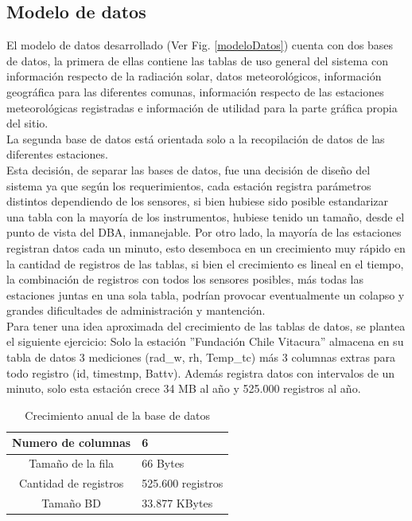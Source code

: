 \subsection{Modelo de datos}
El modelo de datos desarrollado (Ver Fig. \ref{modeloDatos}) cuenta con dos bases de datos, la primera de ellas contiene las tablas de uso general del sistema con información respecto de la radiación solar, datos meteorológicos, información geográfica para las diferentes comunas, información respecto de las estaciones meteorológicas registradas e información de utilidad para la parte gráfica propia del sitio.\\ La segunda base de datos está orientada solo a la recopilación de datos de las diferentes estaciones.\\ Esta decisión, de separar las bases de datos, fue una decisión de diseño del sistema ya que según los requerimientos, cada estación registra parámetros distintos dependiendo de los sensores, si bien hubiese sido posible estandarizar una tabla con la mayoría de los instrumentos, hubiese tenido un tamaño, desde el punto de vista del DBA, inmanejable. Por otro lado, la mayoría de las estaciones registran datos cada un minuto, esto desemboca en un crecimiento muy rápido en la cantidad de registros de las tablas, si bien el crecimiento es lineal en el tiempo, la combinación de registros con todos los sensores posibles, más todas las estaciones juntas en una sola tabla, podrían provocar eventualmente un colapso y grandes dificultades de administración y mantención.\\

Para tener una idea aproximada del crecimiento de las tablas de datos, se plantea el siguiente ejercicio: Solo la estación ''Fundación Chile Vitacura'' almacena en su tabla de datos 3 mediciones (rad\_w, rh, Temp\_tc) más 3 columnas extras para todo registro (id, timestmp, Battv). Además registra datos con intervalos de un minuto, solo esta estación crece 34 MB al año y 525.000 registros al año.

\begin{table}[h!]
\caption{Crecimiento anual de la base de datos}
\begin{tabular}{| c | p{11cm} |}
        \hline
        Numero de columnas & 6\\
        \hline
	Tamaño de la fila & 66 Bytes\\
	\hline
	Cantidad de registros & 525.600 registros\\
	\hline
	Tamaño BD & 33.877 KBytes\\
	\hline
\end{tabular}
\end{table}

